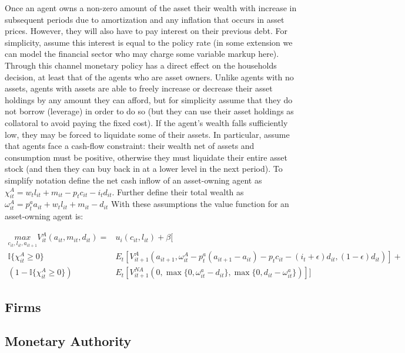 \documentclass{article}
\begin{document}
Once an agent owns a non-zero amount of the asset their wealth with increase in subsequent periods due to amortization and any inflation that occurs in asset prices. However, they will also have to pay interest on their previous debt. For simplicity, assume this interest is equal to the policy rate (in some extension we can model the financial sector who may charge some variable markup here). Through this channel monetary policy has a direct effect on the households decision, at least that of the agents who are asset owners. Unlike agents with no assets, agents with assets are able to freely increase or decrease their asset holdings by any amount they can afford, but for simplicity assume that they do not borrow (leverage) in order to do so (but they can use their asset holdings as collatoral to avoid paying the fixed cost). If the agent's wealth falls sufficiently low, they may be forced to liquidate some of their assets. In particular, assume that agents face a cash-flow constraint: their wealth net of assets and consumption must be positive, otherwise they must liquidate their entire asset stock (and then they can buy back in at a lower level in the next period). To simplify notation define the net cash inflow of an asset-owning agent as $\chi^A_{it} = w_t l_{it} + m_{it} - p_t c_{it} - i_t d_{it}$. Further define their total wealth as $\omega^A_{it} = p^a_t a_{it} + w_t l_{it} + m_{it} - d_{it}$ With these assumptions the value function for an asset-owning agent is:

\begin{align}
  \underset{c_{it}, l_{it}, a_{it+1}}{max} V^{A}_{it}(a_{it}, m_{it}, d_{it}) = &u_{i}(c_{it}, l_{it}) + \beta [  \nonumber \\ 
  \mathbb{I}\{ \chi^A_{it} \geq 0 \} &E_t[V^A_{it+1}(a_{it+1}, \omega^A_{it} - p^a_t (a_{it+1} - a_{it}) - p_t c_{it} - (i_t +\epsilon) d_{it}, (1 - \epsilon) d_{it})] + \nonumber \\ 
  \left(1 - \mathbb{I}\{ \chi^A_{it} \geq 0 \} \right) &E_t[V^{NA}_{it+1}(0, \max \{ 0, \omega^a_{it} - d_{it} \}, \max \{ 0, d_{it} - \omega^a_{it} \})]] \label{va}
\end{align}

\subsection{Firms}

\subsection{Monetary Authority}
\end{document}
